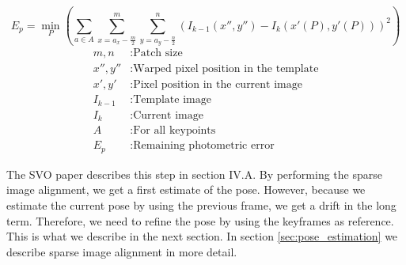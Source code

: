 \documentclass[11pt,a4paper,titlepage,oneside]{report}
\begin{document}
\begin{equation}\label{eq:intensity}
  E_p=\min_P(\sum_{a \in A}\sum_{x=a_x-\frac{m}{2}}^m\sum_{y=a_y-\frac{n}{2}}^n(I_{k-1}(x'',y'')-I_{k}(x'(P),y'(P)))^2)
\end{equation}
\begin{align*}
  m,n        &: \text{Patch size}\\
  x'',y''    &: \text{Warped pixel position in the template}\\
  x',y'      &: \text{Pixel position in the current image}\\
  I_{k-1}    &: \text{Template image}\\
  I_{k}      &: \text{Current image}\\
  A          &: \text{For all keypoints}\\
  E_p        &: \text{Remaining photometric error}
\end{align*}

The SVO paper \cite{svo} describes this step in section IV.A. By performing the sparse image alignment, we get a first estimate of the pose. However, because we estimate the current pose by using the previous frame, we get a drift in the long term. Therefore, we need to refine the pose by using the keyframes as reference. This is what we describe in the next section. In section \ref{sec:pose_estimation} we describe sparse image alignment in more detail.
\end{document}

